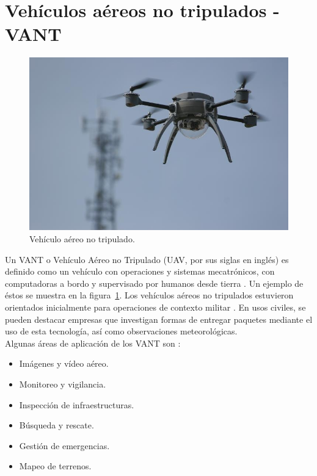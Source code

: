 \section{Vehículos aéreos no tripulados - VANT}

\begin{figure}[H]
\centering
\includegraphics[scale=0.75]{Figures/UAV}
\caption[Vehículo aéreo no tripulado.]{Vehículo aéreo no tripulado\footnotemark.}
\label{fig:UAV}
\end{figure}


Un VANT o Vehículo Aéreo no Tripulado (UAV, por sus siglas en inglés) es definido como un vehículo con operaciones y sistemas mecatrónicos, con computadoras a bordo y supervisado por humanos desde tierra \citep{haluani2015tecnologia}. Un ejemplo de éstos se muestra en la figura~\ref{fig:UAV}. Los vehículos aéreos no tripulados estuvieron orientados inicialmente para operaciones de contexto militar \citep{fahlstrom2012introduction}. En usos civiles, se pueden destacar empresas que investigan formas de entregar paquetes mediante el uso de esta tecnología, así como observaciones meteorológicas.\\

Algunas áreas de aplicación de los VANT son \citep{addati2014introduccion}:

\begin{itemize}
\item Imágenes y vídeo aéreo.
\item Monitoreo y vigilancia.
\item Inspección de infraestructuras.
\item Búsqueda y rescate.
\item Gestión de emergencias.
\item Mapeo de terrenos.
\end{itemize}

